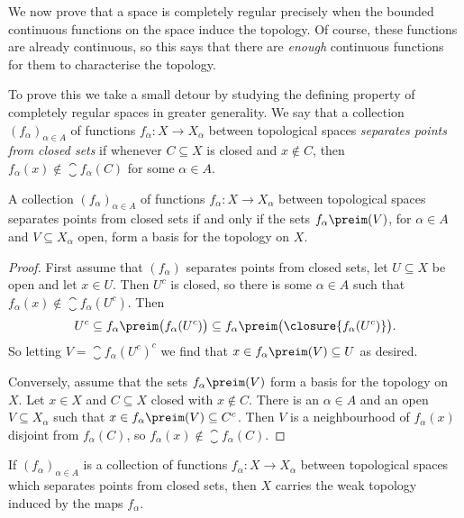 \documentclass[article, a4paper, 11pt, oneside]{memoir}
\numberwithin{equation}{chapter}
\begin{document}
We now prove that a space is completely regular precisely when the bounded continuous functions on the space induce the topology. Of course, these functions are already continuous, so this says that there are \emph{enough} continuous functions for them to characterise the topology.

To prove this we take a small detour by studying the defining property of completely regular spaces in greater generality. We say that a collection $(f_\alpha)_{\alpha \in A}$ of functions $f_\alpha \colon X \to X_\alpha$ between topological spaces \emph{separates points from closed sets} if whenever $C \subseteq X$ is closed and $x \not\in C$, then $f_\alpha(x) \not\in \closure{f_\alpha(C)}$ for some $\alpha \in A$.

\begin{proposition}
    \label{thm:separating-points-from-closed-sets-basis}
    A collection $(f_\alpha)_{\alpha \in A}$ of functions $f_\alpha \colon X \to X_\alpha$ between topological spaces separates points from closed sets if and only if the sets $f_\alpha\preim(V)$, for $\alpha \in A$ and $V \subseteq X_\alpha$ open, form a basis for the topology on $X$.
\end{proposition}

\begin{proof}
    First assume that $(f_\alpha)$ separates points from closed sets, let $U \subseteq X$ be open and let $x \in U$. Then $U^c$ is closed, so there is some $\alpha \in A$ such that $f_\alpha(x) \not\in \closure{f_\alpha(U^c)}$. Then
    \begin{equation*}
        U^c
            \subseteq f_\alpha\preim \bigl( f_\alpha(U^c) \bigr)
            \subseteq f_\alpha\preim \bigl( \closure{f_\alpha(U^c)} \bigr).
    \end{equation*}
    So letting $V = \closure{f_\alpha(U^c)}^c$ we find that $x \in f_\alpha\preim(V) \subseteq U$ as desired.

    Conversely, assume that the sets $f_\alpha\preim(V)$ form a basis for the topology on $X$. Let $x \in X$ and $C \subseteq X$ closed with $x \not\in C$. There is an $\alpha \in A$ and an open $V \subseteq X_\alpha$ such that $x \in f_\alpha\preim(V) \subseteq C^c$. Then $V$ is a neighbourhood of $f_\alpha(x)$ disjoint from $f_\alpha(C)$, so $f_\alpha(x) \not\in \closure{f_\alpha(C)}$.
\end{proof}


\begin{corollary}
    \label{thm:separating-points-from-closed-sets-weak-topology}
    If $(f_\alpha)_{\alpha \in A}$ is a collection of functions $f_\alpha \colon X \to X_\alpha$ between topological spaces which separates points from closed sets, then $X$ carries the weak topology induced by the maps $f_\alpha$.
\end{corollary}
\end{document}
